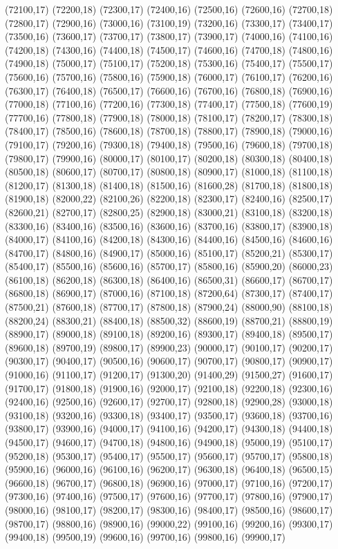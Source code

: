 (72100,17)
(72200,18)
(72300,17)
(72400,16)
(72500,16)
(72600,16)
(72700,18)
(72800,17)
(72900,16)
(73000,16)
(73100,19)
(73200,16)
(73300,17)
(73400,17)
(73500,16)
(73600,17)
(73700,17)
(73800,17)
(73900,17)
(74000,16)
(74100,16)
(74200,18)
(74300,16)
(74400,18)
(74500,17)
(74600,16)
(74700,18)
(74800,16)
(74900,18)
(75000,17)
(75100,17)
(75200,18)
(75300,16)
(75400,17)
(75500,17)
(75600,16)
(75700,16)
(75800,16)
(75900,18)
(76000,17)
(76100,17)
(76200,16)
(76300,17)
(76400,18)
(76500,17)
(76600,16)
(76700,16)
(76800,18)
(76900,16)
(77000,18)
(77100,16)
(77200,16)
(77300,18)
(77400,17)
(77500,18)
(77600,19)
(77700,16)
(77800,18)
(77900,18)
(78000,18)
(78100,17)
(78200,17)
(78300,18)
(78400,17)
(78500,16)
(78600,18)
(78700,18)
(78800,17)
(78900,18)
(79000,16)
(79100,17)
(79200,16)
(79300,18)
(79400,18)
(79500,16)
(79600,18)
(79700,18)
(79800,17)
(79900,16)
(80000,17)
(80100,17)
(80200,18)
(80300,18)
(80400,18)
(80500,18)
(80600,17)
(80700,17)
(80800,18)
(80900,17)
(81000,18)
(81100,18)
(81200,17)
(81300,18)
(81400,18)
(81500,16)
(81600,28)
(81700,18)
(81800,18)
(81900,18)
(82000,22)
(82100,26)
(82200,18)
(82300,17)
(82400,16)
(82500,17)
(82600,21)
(82700,17)
(82800,25)
(82900,18)
(83000,21)
(83100,18)
(83200,18)
(83300,16)
(83400,16)
(83500,16)
(83600,16)
(83700,16)
(83800,17)
(83900,18)
(84000,17)
(84100,16)
(84200,18)
(84300,16)
(84400,16)
(84500,16)
(84600,16)
(84700,17)
(84800,16)
(84900,17)
(85000,16)
(85100,17)
(85200,21)
(85300,17)
(85400,17)
(85500,16)
(85600,16)
(85700,17)
(85800,16)
(85900,20)
(86000,23)
(86100,18)
(86200,18)
(86300,18)
(86400,16)
(86500,31)
(86600,17)
(86700,17)
(86800,18)
(86900,17)
(87000,16)
(87100,18)
(87200,64)
(87300,17)
(87400,17)
(87500,21)
(87600,18)
(87700,17)
(87800,18)
(87900,24)
(88000,90)
(88100,18)
(88200,24)
(88300,21)
(88400,18)
(88500,32)
(88600,19)
(88700,21)
(88800,19)
(88900,17)
(89000,18)
(89100,18)
(89200,16)
(89300,17)
(89400,18)
(89500,17)
(89600,18)
(89700,19)
(89800,17)
(89900,23)
(90000,17)
(90100,17)
(90200,17)
(90300,17)
(90400,17)
(90500,16)
(90600,17)
(90700,17)
(90800,17)
(90900,17)
(91000,16)
(91100,17)
(91200,17)
(91300,20)
(91400,29)
(91500,27)
(91600,17)
(91700,17)
(91800,18)
(91900,16)
(92000,17)
(92100,18)
(92200,18)
(92300,16)
(92400,16)
(92500,16)
(92600,17)
(92700,17)
(92800,18)
(92900,28)
(93000,18)
(93100,18)
(93200,16)
(93300,18)
(93400,17)
(93500,17)
(93600,18)
(93700,16)
(93800,17)
(93900,16)
(94000,17)
(94100,16)
(94200,17)
(94300,18)
(94400,18)
(94500,17)
(94600,17)
(94700,18)
(94800,16)
(94900,18)
(95000,19)
(95100,17)
(95200,18)
(95300,17)
(95400,17)
(95500,17)
(95600,17)
(95700,17)
(95800,18)
(95900,16)
(96000,16)
(96100,16)
(96200,17)
(96300,18)
(96400,18)
(96500,15)
(96600,18)
(96700,17)
(96800,18)
(96900,16)
(97000,17)
(97100,16)
(97200,17)
(97300,16)
(97400,16)
(97500,17)
(97600,16)
(97700,17)
(97800,16)
(97900,17)
(98000,16)
(98100,17)
(98200,17)
(98300,16)
(98400,17)
(98500,16)
(98600,17)
(98700,17)
(98800,16)
(98900,16)
(99000,22)
(99100,16)
(99200,16)
(99300,17)
(99400,18)
(99500,19)
(99600,16)
(99700,16)
(99800,16)
(99900,17)
